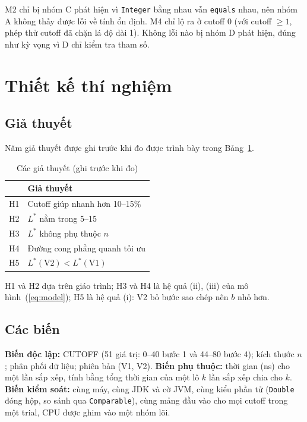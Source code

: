 \documentclass[11pt,a4paper]{article}
\begin{document}
M2 chỉ bị nhóm C phát hiện vì \texttt{Integer} bằng nhau vẫn \texttt{equals} nhau, nên nhóm A không thấy
được lỗi về tính ổn định. M4 chỉ lộ ra ở cutoff 0 (với cutoff $\ge 1$, phép thử cutoff đã chặn lá độ dài 1).
Không lỗi nào bị nhóm D phát hiện, đúng như kỳ vọng vì D chỉ kiểm tra tham số.

\section{Thiết kế thí nghiệm}\label{sec:design}

\subsection{Giả thuyết}
Năm giả thuyết được ghi trước khi đo được trình bày trong Bảng~\ref{tab:hyp}.
\begin{table}[H]
\centering
\begin{tabular}{>{\raggedright}p{}>{\raggedright\arraybackslash}p{}}
\toprule
& Giả thuyết \\
\midrule
H1 & Cutoff giúp nhanh hơn 10--15\% \\
H2 & $L^*$ nằm trong 5--15 \\
H3 & $L^*$ không phụ thuộc $n$ \\
H4 & Đường cong phẳng quanh tối ưu \\
H5 & $L^*(\mathrm{V2}) < L^*(\mathrm{V1})$ \\
\bottomrule
\end{tabular}
\caption{Các giả thuyết (ghi trước khi đo)}
\label{tab:hyp}
\end{table}
H1 và H2 dựa trên giáo trình; H3 và H4 là hệ quả (ii), (iii) của mô hình~(\ref{eq:model});
H5 là hệ quả (i): V2 bỏ bước sao chép nên $b$ nhỏ hơn.

\subsection{Các biến}
\textbf{Biến độc lập:} CUTOFF (51 giá trị: 0--40 bước 1 và 44--80 bước 4); kích thước $n$; phân phối dữ liệu;
phiên bản (V1, V2).
\textbf{Biến phụ thuộc:} thời gian (ns) cho một lần sắp xếp, tính bằng tổng thời gian của một lô $k$ lần
sắp xếp chia cho $k$.
\textbf{Biến kiểm soát:} cùng máy, cùng JDK và cờ JVM, cùng kiểu phần tử (\texttt{Double} đóng hộp, so sánh qua
\texttt{Comparable}), cùng mảng đầu vào cho mọi cutoff trong một trial, CPU được ghim vào một nhóm lõi.
\end{document}
